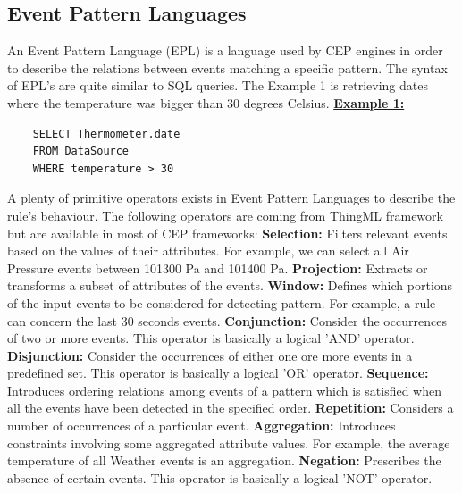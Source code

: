 \documentclass[11pt]{article}
\begin{document}
\subsection{Event Pattern Languages}

An Event Pattern Language (EPL) is a language used by CEP engines in order to describe the relations between events matching a specific pattern. The syntax of EPL's are quite similar to SQL queries. The Example 1 is retrieving dates where the temperature was bigger than 30 degrees Celsius.
\newline
\newline
\underline{\textbf{Example 1:}}
\begin{verbatim}
	SELECT Thermometer.date
	FROM DataSource
	WHERE temperature > 30
\end{verbatim}
A plenty of primitive operators exists in Event Pattern Languages to describe the rule's behaviour. The following operators are coming from ThingML framework but are available in most of CEP frameworks:
\newline
\newline
\textbf{Selection:} Filters relevant events based on the values of their attributes.\cite{6} For example, we can select all Air Pressure events between 101300 Pa and 101400 Pa.
\newline
\textbf{Projection:} Extracts or transforms a subset of attributes of the events.\cite{6}
\newline
\textbf{Window:} Defines which portions of the input events to be considered for detecting pattern.\cite{6} For example, a rule can concern the last 30 seconds events.
\newline
\textbf{Conjunction:} Consider the occurrences of two or more events.\cite{6} This operator is basically a logical 'AND' operator.
\newline
\textbf{Disjunction:} Consider the occurrences of either one ore more events in a predefined set.\cite{6} This operator is basically a logical 'OR' operator.
\newline
\textbf{Sequence:} Introduces ordering relations among events of a pattern which is satisfied when all the events have been detected in the specified order.\cite{6}
\newline
\textbf{Repetition:} Considers a number of occurrences of a particular event.\cite{6}
\newline
\textbf{Aggregation:} Introduces constraints involving some aggregated attribute values.\cite{6} For example, the average temperature of all Weather events is an aggregation.
\newline
\textbf{Negation:} Prescribes the absence of certain events.\cite{6} This operator is basically a logical 'NOT' operator.
\end{document}
